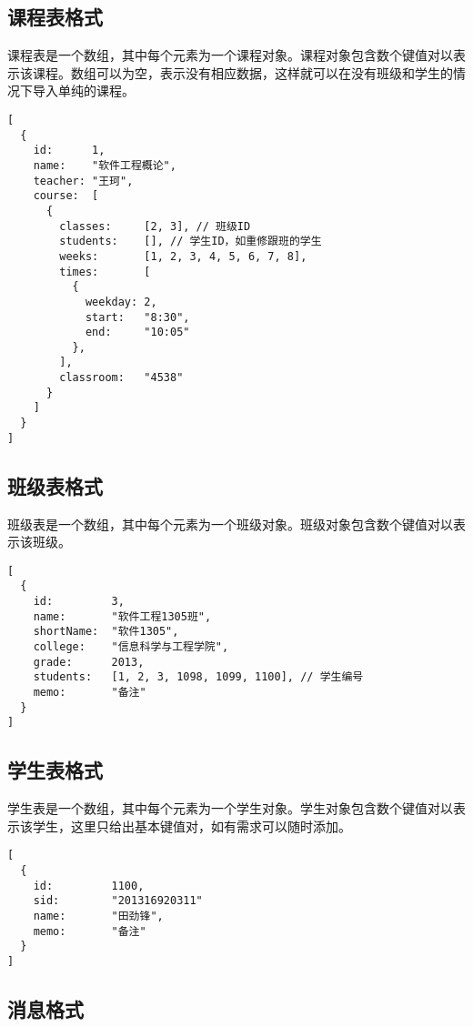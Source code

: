 \documentclass[cs4size,a4paper,nofonts]{ctexart}
\begin{document}
\subsection{课程表格式}\label{sec:课程表格式}

课程表是一个数组，其中每个元素为一个课程对象。课程对象包含数个键值对以表示该课程。数组可以为空，表示没有相应数据，这样就可以在没有班级和学生的情况下导入单纯的课程。

\begin{Verbatim}
[
  {
    id:      1,
    name:    "软件工程概论",
    teacher: "王珂",
    course:  [
      {
        classes:     [2, 3], // 班级ID
        students:    [], // 学生ID，如重修跟班的学生
        weeks:       [1, 2, 3, 4, 5, 6, 7, 8],
        times:       [
          {
            weekday: 2,
            start:   "8:30",
            end:     "10:05"
          },
        ],
        classroom:   "4538"
      }
    ]
  }
]
\end{Verbatim}


\subsection{班级表格式}\label{sec:班级表格式}

班级表是一个数组，其中每个元素为一个班级对象。班级对象包含数个键值对以表示该班级。

\begin{Verbatim}
[
  {
    id:         3,
    name:       "软件工程1305班",
    shortName:  "软件1305",
    college:    "信息科学与工程学院",
    grade:      2013,
    students:   [1, 2, 3, 1098, 1099, 1100], // 学生编号
    memo:       "备注"
  }
]
\end{Verbatim}

\subsection{学生表格式}\label{sec:学生表格式}

学生表是一个数组，其中每个元素为一个学生对象。学生对象包含数个键值对以表示该学生，这里只给出基本键值对，如有需求可以随时添加。

\begin{Verbatim}
[
  {
    id:         1100,
    sid:        "201316920311"
    name:       "田劲锋",
    memo:       "备注"
  }
]
\end{Verbatim}

\subsection{消息格式}\label{sec:消息格式}
\end{document}

